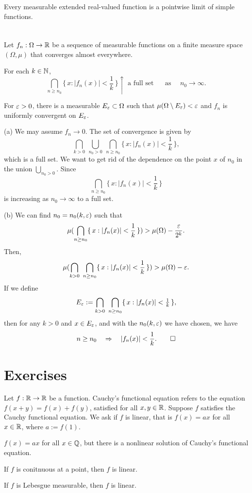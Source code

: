 \documentclass{../note}
\begin{document}
Every measurable extended real-valued function is a pointwise limit of simple functions.



\section{}

\begin{prb}
Let $f_n:\Omega\to\mathbb{R}$ be a sequence of measurable functions on a finite measure space $(\Omega,\mu)$ that converges almost everywhere.
\begin{parts}
\item For each $k\in\mathbb{N}$,
\[\bigcap_{n\ge n_0}\{\,x:|f_n(x)|<\frac1k\,\}\uparrow\text{ a full set }\quad\text{ as }\quad n_0\to\infty.\]
\item For $\varepsilon>0$, there is a measurable $E_\varepsilon\subset\Omega$ such that $\mu(\Omega\setminus E_\varepsilon)<\varepsilon$ and $f_n$ is uniformly convergent on $E_\varepsilon$.
\end{parts}
\end{prb}
\begin{pf}
(a)
We may assume $f_n\to0$.
The set of convergence is given by
\[\bigcap_{k>0}\ \bigcup_{n_0>0}\ \bigcap_{n\ge n_0}\{\,x:|f_n(x)|<\frac1k\,\},\]
which is a full set.
We want to get rid of the dependence on the point $x$ of $n_0$ in the union $\bigcup_{n_0>0}$.
Since
\[\bigcap_{n\ge n_0}\{\,x:|f_n(x)|<\frac1k\,\}\]
is increasing as $n_0\to\infty$ to a full set.

(b)
We can find $n_0=n_0(k,\varepsilon)$ such that
\[\mu(\bigcap_{n\ge n_0}\{\,x:|f_n(x)|<\frac1k\,\})>\mu(\Omega)-\frac{\varepsilon}{2^k}.\]
Then,
\[\mu(\bigcap_{k>0}\ \bigcap_{n\ge n_0}\{\,x:|f_n(x)|<\frac1k\,\})>\mu(\Omega)-\varepsilon.\]
If we define
\[E_\e:=\bigcap_{k>0}\ \bigcap_{n\ge n_0}\{\,x:|f_n(x)|<\tfrac1k\,\},\]
then for any $k>0$ and $x\in E_\varepsilon$, and with the $n_0(k,\varepsilon)$ we have chosen,
we have
\[n\ge n_0\quad\Rightarrow\quad |f_n(x)|<\frac1k.\qedhere\]
\end{pf}



\section*{Exercises}
\begin{prb}
Let $f:\mathbb{R}\to\mathbb{R}$ be a function.
Cauchy's functional equation refers to the equation $f(x+y)=f(x)+f(y)$, satisfied for all $x,y\in\mathbb{R}$.
Suppose $f$ satisfies the Cauchy functional equation.
We ask if $f$ is linear, that is $f(x)=ax$ for all $x\in\mathbb{R}$, where $a:=f(1)$.
\begin{parts}
\item $f(x)=ax$ for all $x\in\mathbb{Q}$, but there is a nonlinear solution of Cauchy's functional equation.
\item If $f$ is conitnuous at a point, then $f$ is linear.
\item If $f$ is Lebesgue measurable, then $f$ is linear.
\end{parts}
\end{prb}
\end{document}

